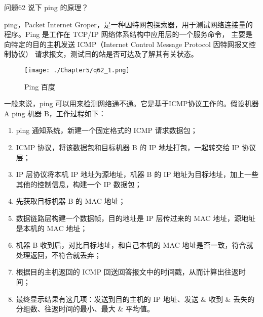 \documentclass[cn,11pt,color=blue,lang=cn]{elegantbook}
\begin{document}
\begin{custom}{问题62}
说下 ping 的原理？
\end{custom}
\begin{solution}
ping，Packet Internet Groper，是一种因特网包探索器，用于测试网络连接量的程序。Ping 是工作在 TCP/IP 网络体系结构中应用层的一个服务命令， 主要是向特定的目的主机发送 ICMP（Internet Control Message Protocol 因特网报文控制协议） 请求报文，测试目的站是否可达及了解其有关状态。

\begin{figure}[!h]
\centering
\texttt{[image: ./Chapter5/q62\_1.png]}
\caption{Ping 百度}
\label{fig62_1}
\end{figure}

一般来说，ping 可以用来检测网络通不通。它是基于ICMP协议工作的。假设机器 A ping 机器 B，工作过程如下：
\begin{enumerate}
	\item ping 通知系统，新建一个固定格式的 ICMP 请求数据包；
	\item ICMP 协议，将该数据包和目标机器 B 的 IP 地址打包，一起转交给 IP 协议层；
	\item IP 层协议将本机 IP 地址为源地址，机器 B 的 IP 地址为目标地址，加上一些其他的控制信息，构建一个 IP 数据包；
	\item 先获取目标机器 B 的 MAC 地址；
	\item 数据链路层构建一个数据帧，目的地址是 IP 层传过来的 MAC 地址，源地址是本机的 MAC 地址；
	\item 机器 B 收到后，对比目标地址，和自己本机的 MAC 地址是否一致，符合就处理返回，不符合就丢弃；
	\item 根据目的主机返回的 ICMP 回送回答报文中的时间戳，从而计算出往返时间；
	\item 最终显示结果有这几项：发送到目的主机的 IP 地址、发送 \& 收到 \& 丢失的分组数、往返时间的最小、最大 \& 平均值。
\end{enumerate}
\end{solution}
\end{document}
